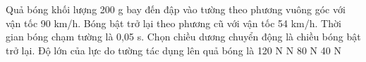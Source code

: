 \begin{vidu}%
Quả bóng khối lượng 200 g bay đến đập vào tường theo phương vuông góc với vận tốc 90 km/h. Bóng bật trở lại theo phương cũ với vận tốc 54 km/h. Thời gian bóng chạm tường là 0,05 s. Chọn chiều dương chuyển động là chiều bóng bật trở lại. Độ lớn của lực do tường tác dụng lên quả bóng là
\choice
{120 N}
{ N}
{80 N}
{40 N}
 \end{vidu}

